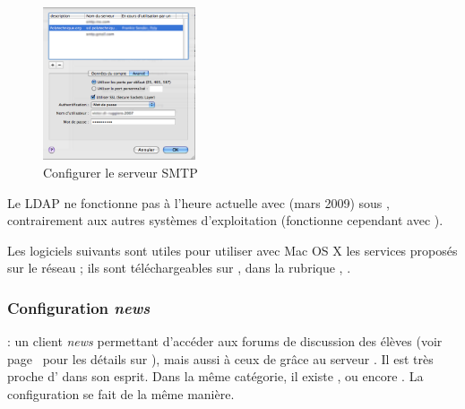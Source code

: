 \begin{figure}[!hl]
    \begin{center}
	      \includegraphics[width=0.4\textwidth]{images/mac_config_smtp_poltechnique.png} 
      \caption{Configurer le serveur SMTP }
    \end{center}
  \end{figure}



Le LDAP ne fonctionne pas à l'heure actuelle avec  (mars 2009) sous , contrairement aux  autres systèmes d'exploitation (fonctionne cependant avec ).



Les logiciels suivants sont utiles pour utiliser avec Mac OS X les services proposés sur le réseau ; ils sont téléchargeables sur , dans la rubrique , .



\subsubsection{Configuration \emph{news}}

 : un client \emph{news} permettant d'accéder aux forums de discussion des élèves (voir page~\pageref{newsgroups} pour les détails sur ), mais aussi à ceux de  grâce au serveur . Il est très proche d' dans son esprit. Dans la même catégorie, il existe ,  ou encore . La configuration se fait de la même manière.


